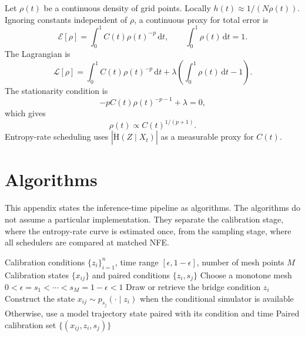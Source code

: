 \documentclass{article}
\newcommand{\Ent}{\mathrm{H}}
\newcommand{\dd}{\mathrm{d}}
\theoremstyle{plain}
\theoremstyle{definition}
\theoremstyle{remark}
\begin{document}
Let $\rho(t)$ be a continuous density of grid points. Locally $h(t)\approx 1/(N\rho(t))$. Ignoring constants independent of $\rho$, a continuous proxy for total error is
\begin{equation}
  \mathcal{E}[\rho]=\int_0^1 C(t)\rho(t)^{-p}\,\dd t,
  \qquad
  \int_0^1\rho(t)\,\dd t=1.
\end{equation}
The Lagrangian is
\begin{equation}
  \mathcal{L}[\rho]
  =
  \int_0^1 C(t)\rho(t)^{-p}\,\dd t
  +
  \lambda\left(\int_0^1\rho(t)\,\dd t-1\right).
\end{equation}
The stationarity condition is
\begin{equation}
  -pC(t)\rho(t)^{-p-1}+\lambda=0,
\end{equation}
which gives
\begin{equation}
  \rho(t)\propto C(t)^{1/(p+1)}.
\end{equation}
Entropy-rate scheduling uses $|\dot{\Ent}(Z\mid X_t)|$ as a measurable proxy for $C(t)$.

\section{Algorithms}
\label{app:algorithms}

This appendix states the inference-time pipeline as algorithms. The algorithms do not assume a particular implementation. They separate the calibration stage, where the entropy-rate curve is estimated once, from the sampling stage, where all schedulers are compared at matched NFE.

\begin{algorithm}[H]
  \caption{Calibration Set and Time Mesh Construction}
  \label{alg:calibration}
  \begin{algorithmic}[1]
    \REQUIRE Calibration conditions $\{z_i\}_{i=1}^n$, time range $[\epsilon,1-\epsilon]$, number of mesh points $M$
    \ENSURE Calibration states $\{x_{ij}\}$ and paired conditions $\{z_i,s_j\}$
    \STATE Choose a monotone mesh $0<\epsilon=s_1<\cdots<s_M=1-\epsilon<1$
      \STATE Draw or retrieve the bridge condition $z_i$
        \STATE Construct the state $x_{ij}\sim p_{s_j}(\cdot\mid z_i)$ when the conditional simulator is available
        \STATE Otherwise, use a model trajectory state paired with its condition and time
      \ENDFOR
    \ENDFOR
    \RETURN Paired calibration set $\{(x_{ij},z_i,s_j)\}$
  \end{algorithmic}
\end{algorithm}
\end{document}
